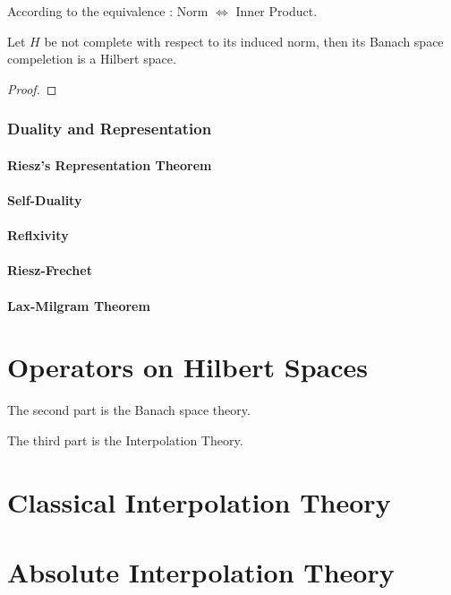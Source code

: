 \documentclass[Total.tex]{subfiles}
\begin{document}
			According to the equivalence : Norm $\Leftrightarrow$ Inner Product.	

			\begin{proposition}
				Let $H$ be not complete with respect to its induced norm, then its Banach space compeletion is a Hilbert space.
			\end{proposition}
			\begin{proof}
				
			\end{proof}
			
			\subsection{Duality and Representation}
			\subsubsection{Riesz's Representation Theorem}
			
			\subsubsection{Self-Duality}
			
			\subsubsection{Reflxivity}
			
			\subsubsection{Riesz-Frechet}
			
			\subsubsection{Lax-Milgram Theorem}
			
		\chapter{Operators on Hilbert Spaces}
			
	\newpage The second part is the Banach space theory.
		
	\newpage The third part is the Interpolation Theory.
	
		\chapter{Classical Interpolation Theory}
		
		\chapter{Absolute Interpolation Theory}
\end{document}
